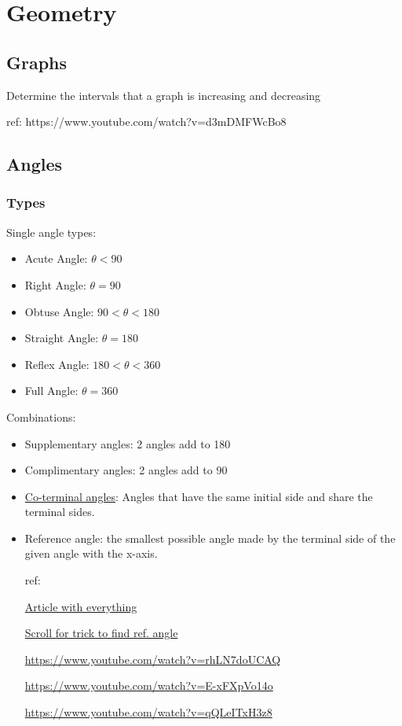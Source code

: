 \documentclass[openany]{book}
\begin{document}
\part{Geometry}

\chapter{Graphs}

Determine the intervals that a graph is increasing and decreasing

ref:
https://www.youtube.com/watch?v=d3mDMFWcBo8

\chapter{Angles}

\section{Types}

Single angle types:
\begin{itemize}
	\item Acute Angle: \( \theta < 90 \)
	\item Right Angle: \( \theta = 90 \)
	\item Obtuse Angle: \( 90 < \theta < 180 \)
	\item Straight Angle: \( \theta = 180 \)
	\item Reflex Angle: \( 180 < \theta < 360 \)
	\item Full Angle:  \( \theta = 360 \)
	      
\end{itemize}

Combinations:
\begin{itemize}
	\item Supplementary angles: 2 angles add to 180
	\item Complimentary angles: 2 angles add to 90
	\item \href{https://www.cuemath.com/geometry/coterminal-angles/}{Co-terminal angles}: Angles that have the same initial side and share the terminal sides.
	\item Reference angle: the smallest possible angle made by the terminal side of the given angle with the x-axis.
	      
	      ref:
	      
	      \href{https://www.piday.org/calculators/reference-angle-calculator/}{Article with everything}
	      
	      \href{https://www.cuemath.com/geometry/reference-angle/}{Scroll for trick to find ref. angle}
	      
	      \url{https://www.youtube.com/watch?v=rhLN7doUCAQ}
	      
	      \url{https://www.youtube.com/watch?v=E-xFXpVo14o}
	      
	      \url{https://www.youtube.com/watch?v=qQLeITxH3z8}
	      
\end{itemize}
\end{document}
